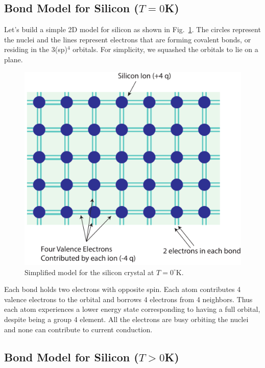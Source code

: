 \subsection{Bond Model for Silicon ($T=0$K)}


Let's build a simple 2D model for silicon as shown in Fig.~\ref{fig:silicon_model}.  The circles represent the nuclei and the lines represent electrons that are forming covalent bonds, or residing in the 3(sp)$^4$ orbitals.  For simplicity, we squashed the orbitals to lie on a plane.


\begin{figure}[tb]
\begin{center}
\includegraphics[width=.65\columnwidth]{silicon_model}
\end{center}
\caption{Simplified model for the  silicon crystal at $T=0^\circ$K. } \label{fig:silicon_model}
\end{figure}


Each bond holds two electrons with opposite spin.  Each atom contributes 4 valence electrons to the orbital and borrows 4 electrons from 4 neighbors.  Thus each atom experiences a lower energy state corresponding to having a full orbital, despite being a group 4 element.  All the electrons are busy orbiting the nuclei and none can contribute to current conduction.




\subsection{Bond Model for Silicon ($T>0$K)}


